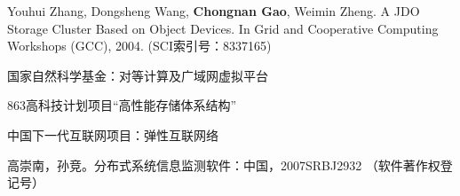 \begin{resume}
\begin{enumerate}[{[}1{]}]
  \item Youhui Zhang, Dongsheng Wang, \textbf{Chongnan Gao}, Weimin Zheng. A
  JDO Storage Cluster Based on Object Devices. In Grid and Cooperative
  Computing Workshops (GCC), 2004. (SCI索引号：8337165)

  \end{enumerate}

  \begin{enumerate}[{[}1{]}]

  \item 国家自然科学基金：对等计算及广域网虚拟平台

  \item 863高科技计划项目“高性能存储体系结构”

  \item 中国下一代互联网项目：弹性互联网络

  \end{enumerate}

  \begin{enumerate}[{[}1{]}]

  \item 高崇南，孙竞。分布式系统信息监测软件：中国，2007SRBJ2932
  （软件著作权登记号）

  \end{enumerate}
\end{resume}
